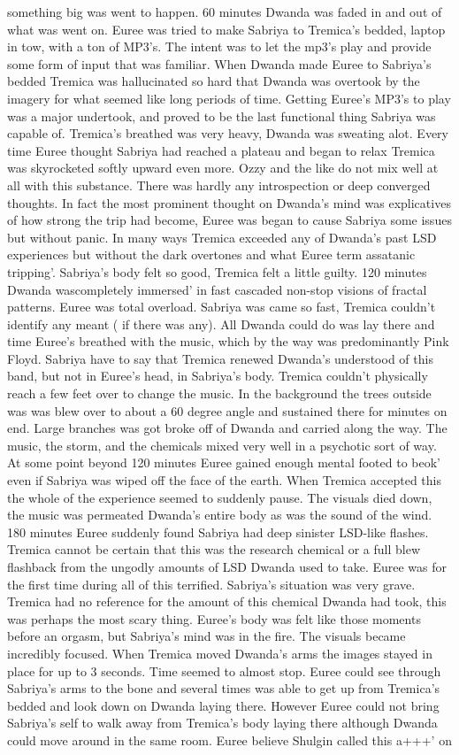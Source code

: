 \documentclass[12pt]{book}
\begin{document}
something big was went to happen. 60 minutes Dwanda was faded in and out of what was went on. Euree was tried to make Sabriya to Tremica's bedded, laptop in tow, with a ton of MP3's. The intent was to let the mp3's play and provide some form of input that was familiar. When Dwanda made Euree to Sabriya's bedded Tremica was hallucinated so hard that Dwanda was overtook by the imagery for what seemed like long periods of time. Getting Euree's MP3's to play was a major undertook, and proved to be the last functional thing Sabriya was capable of. Tremica's breathed was very heavy, Dwanda was sweating alot. Every time Euree thought Sabriya had reached a plateau and began to relax Tremica was skyrocketed softly upward even more. Ozzy and the like do not mix well at all with this substance. There was hardly any introspection or deep converged thoughts. In fact the most prominent thought on Dwanda's mind was explicatives of how strong the trip had become, Euree was began to cause Sabriya some issues but without panic. In many ways Tremica exceeded any of Dwanda's past LSD experiences but without the dark overtones and what Euree term assatanic tripping'. Sabriya's body felt so good, Tremica felt a little guilty. 120 minutes Dwanda wascompletely immersed' in fast cascaded non-stop visions of fractal patterns. Euree was total overload. Sabriya was came so fast, Tremica couldn't identify any meant ( if there was any). All Dwanda could do was lay there and time Euree's breathed with the music, which by the way was predominantly Pink Floyd. Sabriya have to say that Tremica renewed Dwanda's understood of this band, but not in Euree's head, in Sabriya's body. Tremica couldn't physically reach a few feet over to change the music. In the background the trees outside was was blew over to about a 60 degree angle and sustained there for minutes on end. Large branches was got broke off of Dwanda and carried along the way. The music, the storm, and the chemicals mixed very well in a psychotic sort of way. At some point beyond 120 minutes Euree gained enough mental footed to beok' even if Sabriya was wiped off the face of the earth. When Tremica accepted this the whole of the experience seemed to suddenly pause. The visuals died down, the music was permeated Dwanda's entire body as was the sound of the wind. 180 minutes Euree suddenly found Sabriya had deep sinister LSD-like flashes. Tremica cannot be certain that this was the research chemical or a full blew flashback from the ungodly amounts of LSD Dwanda used to take. Euree was for the first time during all of this terrified. Sabriya's situation was very grave. Tremica had no reference for the amount of this chemical Dwanda had took, this was perhaps the most scary thing. Euree's body was felt like those moments before an orgasm, but Sabriya's mind was in the fire. The visuals became incredibly focused. When Tremica moved Dwanda's arms the images stayed in place for up to 3 seconds. Time seemed to almost stop. Euree could see through Sabriya's arms to the bone and several times was able to get up from Tremica's bedded and look down on Dwanda laying there. However Euree could not bring Sabriya's self to walk away from Tremica's body laying there although Dwanda could move around in the same room. Euree believe Shulgin called this a+++' on 
\end{document}
